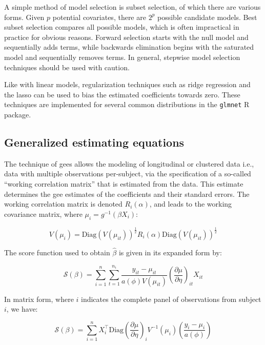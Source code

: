 \documentclass{report}
\begin{document}
A simple method of model selection is subset selection, of which there are various forms. Given $p$ potential covariates, there are $2^p$ possible candidate models. Best subset selection compares all possible models, which is often impractical in practice for obvious reasons. Forward selection starts with the null model and sequentially adds terms, while backwards elimination begins with the saturated model and sequentially removes terms. In general, stepwise model selection techniques should be used with caution. 

Like with linear models, regularization techniques such as ridge regression and the \gls{lasso} can be used to bias the estimated coefficients towards zero. These techniques are implemented for several common distributions in the \texttt{glmnet} R package. 

\subsection{Generalized estimating equations}

The technique of \glspl{gee} allows the modeling of longitudinal or clustered data i.e., data with multiple observations per-subject, via the specification of a so-called ``working correlation matrix'' that is estimated from the data. This estimate determines the \gls{gee} estimates of the coefficients and their standard errors. The working correlation matrix is denoted $R_i(\alpha)$, and leads to the working covariance matrix, where $\mu_i = g^{-1}(\beta X_i)$:

\begin{equation}\label{eq:glm-gee-working-covariance-matrix}
    V(\mu_i) = \text{Diag}\left(V(\mu_{it})\right)^\frac{1}{2} R_i(\alpha) \text{Diag}\left(V(\mu_{it})\right)^\frac{1}{2}
\end{equation}

The score function used to obtain $\hat{\beta}$ is given in its expanded form by:

\begin{equation}\label{eq:glm-gee-score-equation-beta-1}
    \mathcal{S}(\beta) = \sum_{i=1}^n \sum_{t=1}^{n_i} \frac{y_{it} - \mu_{it}}{a(\phi)V(\mu_{it})} \left(\frac{\partial\mu}{\partial\eta}\right)_{it} X_{it}
\end{equation}

In matrix form, where $i$ indicates the complete panel of observations from subject $i$, we have:

\begin{equation}\label{eq:glm-gee-score-equation-beta-2}
    \mathcal{S}(\beta) = \sum_{i=1}^n X_i^\intercal \text{Diag}\left(\frac{\partial\mu}{\partial\eta}\right)_i V^{-1}(\mu_i) \left(\frac{y_i - \mu_i}{a(\phi)}\right)
\end{equation}
\end{document}
